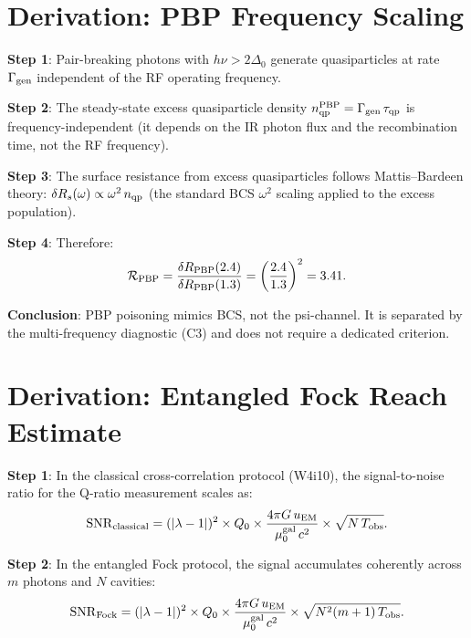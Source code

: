 \documentclass[11pt]{article}
\newcommand{\lbone}{|\lambda - 1|}
\newcommand{\muG}{\mu_0^{\rm gal}}
\newcommand{\SNR}{\mathrm{SNR}}
\theoremstyle{definition}
\theoremstyle{remark}
\begin{document}
\section{Derivation: PBP Frequency Scaling}
\label{sec:pbp_derivation}

\textbf{Step 1}: Pair-breaking photons with $h\nu > 2\Delta_0$ generate
quasiparticles at rate $\Gamma_{\rm gen}$ independent of the RF
operating frequency.

\textbf{Step 2}: The steady-state excess quasiparticle density
$n_{\rm qp}^{\rm PBP} = \Gamma_{\rm gen}\,\tau_{\rm qp}$ is
frequency-independent (it depends on the IR photon flux and the
recombination time, not the RF frequency).

\textbf{Step 3}: The surface resistance from excess quasiparticles
follows Mattis--Bardeen theory:
$\delta R_s(\omega) \propto \omega^2\,n_{\rm qp}$
(the standard BCS $\omega^2$ scaling applied to the excess population).

\textbf{Step 4}: Therefore:
\begin{equation}
\mathcal{R}_{\rm PBP} = \frac{\delta R_{\rm PBP}(2.4)}
{\delta R_{\rm PBP}(1.3)} = \left(\frac{2.4}{1.3}\right)^2 = 3.41.
\end{equation}

\textbf{Conclusion}: PBP poisoning mimics BCS, not the psi-channel.
It is separated by the multi-frequency diagnostic (C3) and does not
require a dedicated criterion.


\section{Derivation: Entangled Fock Reach Estimate}
\label{sec:fock_derivation}

\textbf{Step 1}: In the classical cross-correlation protocol (W4i10),
the signal-to-noise ratio for the Q-ratio measurement scales as:
\begin{equation}
\SNR_{\rm classical} = (\lbone)^2 \times Q_0 \times
\frac{4\pi G\,u_{\rm EM}}{\muG\,c^2} \times \sqrt{N\,T_{\rm obs}}.
\end{equation}

\textbf{Step 2}: In the entangled Fock protocol, the signal
accumulates coherently across $m$ photons and $N$ cavities:
\begin{equation}
\SNR_{\rm Fock} = (\lbone)^2 \times Q_0 \times
\frac{4\pi G\,u_{\rm EM}}{\muG\,c^2} \times
\sqrt{N^2(m+1)\,T_{\rm obs}}.
\end{equation}
\end{document}
